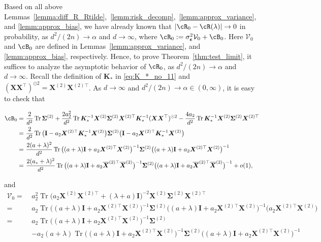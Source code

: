 \documentclass[twoside,11pt]{article}
\newcommand{\bepsilon}{\boldsymbol{\epsilon}}
\def\bI{{\mathbf I}}
\def\bK{{\boldsymbol K}}
\def\bX{{\boldsymbol X}}
\def\bSigma{{\boldsymbol \Sigma}}
\def\cV{{\mathcal V}}
\def\cV{{\mathcal V}}
\renewcommand{\bK}{\boldsymbol{K}}
\newcommand{\Tr}{\operatorname{Tr}}
\newcommand{\1}{\mathbf{1}}
\newenvironment{proofoftheorem}[1]{\par\noindent{\bf Proof of Theorem #1\ }}{\hfill\BlackBox\\[2mm]}
\begin{document}
\begin{proofoftheorem}{\ref{thm:test_limit}}
Based on all above Lemmas~\ref{lemma:diff_R_Rtilde},~\ref{lemm:risk_decomp},~\ref{lemm:approx_variance}, and \ref{lemm:approx_bias}, we have already known that $|\cR_0-\cR(\lambda)|\to 0$ in probability, as $d^2/(2n)\to\alpha$ and  $d\to\infty$, where $\cR_0:=\sigma_{\bepsilon}^2\cV_0+\cB_0$.
Here $\cV_0$ and $\cB_0$ are defined in Lemmas~\ref{lemm:approx_variance}, and \ref{lemm:approx_bias}, respectively. Hence, to prove Theorem~\ref{thm:test_limit}, it suffices to analyze the asymptotic behavior of $\cR_0$, as $d^2/(2n)\to\alpha$ and $d\to\infty$. Recall the definition of $\bK_*$ in \eqref{eq:K_*_no_11} and $(\bX\bX^\top)^{\odot 2} = \bX^{(2)}\bX^{(2)\top}$. As $d\to\infty$ and $d^2/(2n)\to\alpha\in(0,\infty)$, it is easy to check that
\begin{small}
\begin{align}
    \cB_0 =~&   \frac{2}{d^2 } \Tr\bSigma^{(2)}  + \frac{ 2a_2^2}{d^2}\Tr \bK_{*}^{-1}\bX^{(2)}\bSigma^{(2)}\bX^{(2)\top}\bK_{*}^{-1}(\bX\bX^\top)^{\odot 2}-\frac{4a_2}{d^2}\Tr\bK_{*}^{-1}\bX^{(2)}\bSigma^{(2)}\bX^{(2)\top}\\
    =~& \frac{2}{d^2}\Tr \big(\bI-a_2\bX^{(2)\top}\bK_{*}^{-1}\bX^{(2)}\big)\bSigma^{(2)}\big(\bI-a_2\bX^{(2)\top}\bK_{*}^{-1}\bX^{(2)}\big)\\
    =~& \frac{2(a+\lambda)^2}{d^2}\Tr\big((a +\lambda)\bI+a_2\bX^{(2)\top}\bX^{(2)}\big)^{-1}\bSigma^{(2)} \big((a +\lambda)\bI+a_2\bX^{(2)\top}\bX^{(2)}\big)^{-1}\\
     =~& \frac{2(a_*+\lambda)^2}{d^2}\Tr\big((a +\lambda)\bI+a_2\overline\bX^{(2)\top}\overline\bX^{(2)}\big)^{-1}\bSigma^{(2)} \big((a +\lambda)\bI+a_2\overline\bX^{(2)\top}\overline\bX^{(2)}\big)^{-1}+o(1),
\end{align}
\end{small}
and
\begin{align}
    \cV_0 =~&a_2^2\Tr\big(a_2\bX^{(2)}\bX^{(2)\top}+(\lambda+a )\bI\big)^{-2}  {\bX}^{(2)}\bSigma^{(2)} {\bX}^{(2)\top}\label{eq:cV_0}\\
    =~& a_2 \Tr\big((a +\lambda)\bI+a_2\bX^{(2)\top}\bX^{(2)}\big)^{-1}\bSigma^{(2)} \big((a+\lambda)\bI+a_2\bX^{(2)\top}\bX^{(2)}\big)^{-1}\big(a_2\bX^{(2)\top}\bX^{(2)}\big)\\=~&  a_2 \Tr\big((a +\lambda)\bI+a_2\bX^{(2)\top}\bX^{(2)}\big)^{-1}\bSigma^{(2)}\\
    ~&-  a_2(a+\lambda)\Tr\big((a+\lambda)\bI+a_2\bX^{(2)\top}\bX^{(2)}\big)^{-1}\bSigma^{(2)} \big((a+\lambda)\bI+a_2\bX^{(2)\top}\bX^{(2)}\big)^{-1}\\

\end{align}
\end{proofoftheorem}
\end{document}
